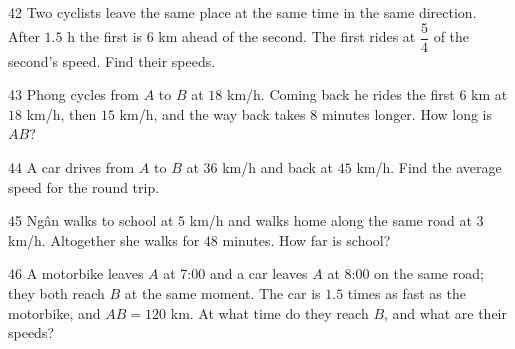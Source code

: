 \gap
\begin{probbox}{42}{}
Two cyclists leave the same place at the same time in the same direction. After $1.5$ h the first is $6$ km ahead of the second. The first rides at $\dfrac54$ of the second's speed. Find their speeds.
\end{probbox}
\gap
\begin{probbox}{43}{}
Phong cycles from $A$ to $B$ at $18$ km/h. Coming back he rides the first $6$ km at $18$ km/h, then $15$ km/h, and the way back takes $8$ minutes longer. How long is $AB$?
\end{probbox}
\gap
\begin{probbox}{44}{}
A car drives from $A$ to $B$ at $36$ km/h and back at $45$ km/h. Find the average speed for the round trip.
\end{probbox}
\gap
\begin{probbox}{45}{}
Ngân walks to school at $5$ km/h and walks home along the same road at $3$ km/h. Altogether she walks for $48$ minutes. How far is school?
\end{probbox}
\gap
\begin{probbox}{46}{}
A motorbike leaves $A$ at 7:00 and a car leaves $A$ at 8:00 on the same road; they both reach $B$ at the same moment. The car is $1.5$ times as fast as the motorbike, and $AB=120$ km. At what time do they reach $B$, and what are their speeds?
\end{probbox}
